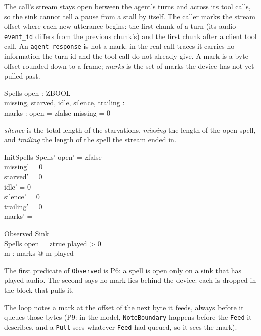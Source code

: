 \documentclass[a4paper,10pt,fleqn]{article}
\begin{document}
The call's stream stays open between the agent's turns and across its tool
calls, so the sink cannot tell a pause from a stall by itself. The caller
marks the stream offset where each new utterance begins: the first chunk of a
turn (its audio \texttt{event\_id} differs from the previous chunk's) and the
first chunk after a client tool call. An \texttt{agent\_response} is not a
mark: in the real call traces it carries no information the turn id and the
tool call do not already give.
A mark is a byte offset rounded down to a frame; \emph{marks} is the set of
marks the device has not yet pulled past.

\begin{schema}{Spells}
  open : ZBOOL \\
  missing, starved, idle, silence, trailing : \nat \\
  marks : \finset \nat
\where
  open = zfalse \implies missing = 0
\end{schema}

\emph{silence} is the total length of the starvations, \emph{missing} the
length of the open spell, and \emph{trailing} the length of the spell the
stream ended in.

\begin{schema}{InitSpells}
  Spells'
\where
  open' = zfalse \\
  missing' = 0 \\
  starved' = 0 \\
  idle' = 0 \\
  silence' = 0 \\
  trailing' = 0 \\
  marks' = \emptyset
\end{schema}

\begin{schema}{Observed}
  Sink \\
  Spells
\where
  open = ztrue \implies played > 0 \\
  \forall m : marks @ m \geq played
\end{schema}

The first predicate of \texttt{Observed} is P6: a spell is open only on a
sink that has played audio. The second says no mark lies behind the device:
each is dropped in the block that pulls it.

The loop notes a mark at the offset of the next byte it feeds, always before
it queues those bytes (P9: in the model, \texttt{NoteBoundary} happens before
the \texttt{Feed} it describes, and a \texttt{Pull} sees whatever
\texttt{Feed} had queued, so it sees the mark).
\end{document}
